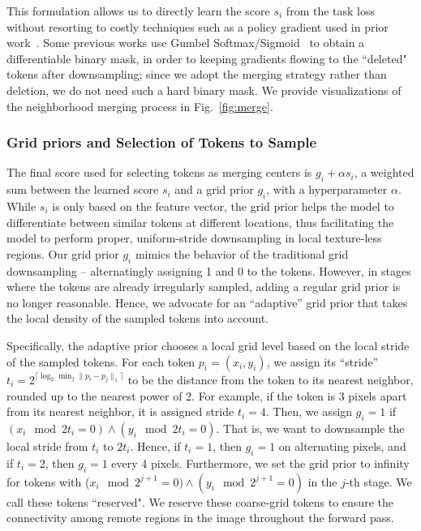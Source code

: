 \documentclass[10pt,twocolumn,letterpaper]{article}
\begin{document}
This formulation allows us to directly learn the score $s_i$ from the task loss without resorting to costly techniques such as a policy gradient used in prior work~\cite{iared}. 
Some previous works use Gumbel Softmax/Sigmoid~\cite{adavit} to obtain a differentiable binary mask, in order to 
keeping gradients flowing to the ``deleted" tokens after downsampling; since we adopt the merging strategy rather than deletion, we do not need such a hard binary mask.
We provide visualizations of the neighborhood merging process in Fig.~\ref{fig:merge}.

\subsubsection{Grid priors and Selection of Tokens to Sample}
\label{sec:grid_prior}

The final score used for selecting tokens as merging centers is $g_i + \alpha s_i$, a weighted sum between the learned score $s_i$ and a grid prior $g_i$, with a hyperparameter $\alpha$. While $s_i$ is only based on the feature vector, the grid prior helps the model to differentiate between similar tokens at different locations, thus facilitating the model to perform proper, uniform-stride downsampling in local texture-less regions.
Our grid prior $g_i$ mimics the behavior of the traditional grid downsampling -- alternatingly assigning 1 and 0 to the tokens. However, in stages where the tokens are already irregularly sampled, adding a regular grid prior is no longer reasonable. Hence, we advocate for an ``adaptive'' grid prior that takes the local density of the sampled tokens into account.

Specifically, the adaptive prior chooses a local grid level based on the local stride of the sampled tokens. For each token $p_i = (x_i, y_i)$, we assign its ``stride'' $t_i = 2^{ \lceil \log_2 \min_j \|p_i - p_j\|_1\rceil}$ to be the distance from the token to its nearest neighbor, rounded up to the nearest power of 2. For example, if the token is $3$ pixels apart from its nearest neighbor, it is assigned stride $t_i=4$. Then, we assign $g_i = 1$ if $(x_i \mod 2 t_i = 0) \wedge  (y_i \mod 2 t_i = 0)$. That is, we want to downsample the local stride from $t_i$ to $2t_i$. Hence, if $t_i = 1$, then $g_i = 1$ on alternating pixels, and if $t_i = 2$, then $g_i = 1$ every 4 pixels. 
Furthermore, we set the grid prior to infinity for tokens with ($x_i \mod 2^{j+1} = 0) \wedge (y_i \mod 2^{j+1} = 0)$ in the $j$-th stage.  We call these tokens ``reserved". We reserve these coarse-grid tokens to ensure the connectivity among remote regions in the image throughout the forward pass.
\end{document}
